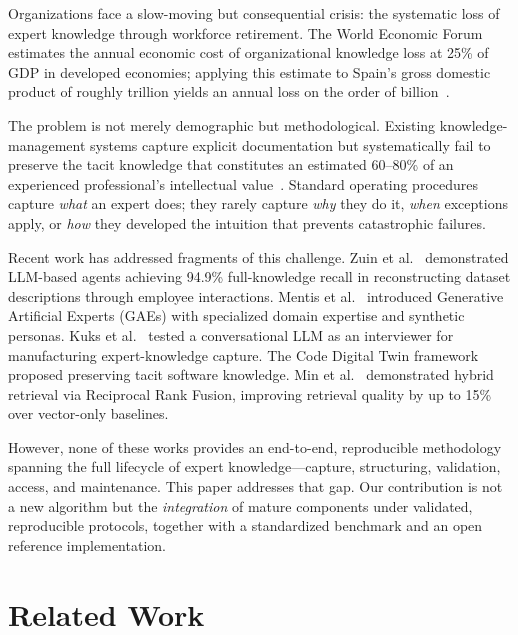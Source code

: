 \documentclass[11pt,a4paper]{article}
\begin{document}
Organizations face a slow-moving but consequential crisis: the systematic loss of expert knowledge through workforce retirement. The World Economic Forum estimates the annual economic cost of organizational knowledge loss at 25\% of GDP in developed economies; applying this estimate to Spain's gross domestic product of roughly  trillion yields an annual loss on the order of  billion~\cite{wef2025}.

The problem is not merely demographic but methodological. Existing knowledge-management systems capture explicit documentation but systematically fail to preserve the tacit knowledge that constitutes an estimated 60--80\% of an experienced professional's intellectual value~\cite{nonaka1995}. Standard operating procedures capture \emph{what} an expert does; they rarely capture \emph{why} they do it, \emph{when} exceptions apply, or \emph{how} they developed the intuition that prevents catastrophic failures.

Recent work has addressed fragments of this challenge. Zuin et al.~\cite{zuin2025} demonstrated LLM-based agents achieving 94.9\% full-knowledge recall in reconstructing dataset descriptions through employee interactions. Mentis et al.~\cite{mentis2025} introduced Generative Artificial Experts (GAEs) with specialized domain expertise and synthetic personas. Kuks et al.~\cite{kuks2025} tested a conversational LLM as an interviewer for manufacturing expert-knowledge capture. The Code Digital Twin framework~\cite{cdt2025} proposed preserving tacit software knowledge. Min et al.~\cite{min2025} demonstrated hybrid retrieval via Reciprocal Rank Fusion, improving retrieval quality by up to 15\% over vector-only baselines.

However, none of these works provides an end-to-end, reproducible methodology spanning the full lifecycle of expert knowledge---capture, structuring, validation, access, and maintenance. This paper addresses that gap. Our contribution is not a new algorithm but the \emph{integration} of mature components under validated, reproducible protocols, together with a standardized benchmark and an open reference implementation.

\section{Related Work}
\end{document}
